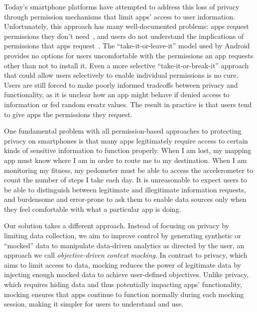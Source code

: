 Today's smartphone platforms have attempted to address this loss of privacy
through permission mechanisms that limit apps' access to user information.
Unfortunately, this approach has many well-documented problems: apps request
permissions they don't need~\cite{taintdroid-osdi,demystified-ccs11}, and users
do not understand the implications of permissions that apps
request~\cite{androidperms-soups12}. The ``take-it-or-leave-it'' model used by
Android provides no options for users uncomfortable with the permissions an app
requests other than not to install it. Even a more selective
``take-it-or-break-it'' approach~\cite{apex-asiaccs10} that could allow users
selectively to enable individual permissions is no cure.  Users are still
forced to make poorly informed tradeoffs between privacy and functionality, as
it is unclear how an app might behave if denied access to information or fed
random ersatz values. The result in practice is that users tend to give apps
the permissions they request.


One fundamental problem with all permission-based approaches to protecting
privacy on smartphones is that many apps legitimately require access to certain
kinds of sensitive information to function properly. When I am lost, my mapping
app must know where I am in order to route me to my destination. When I am
monitoring my fitness, my pedometer must be able to access the accelerometer to
count the number of steps I take each day. It is unreasonable to expect users
to be able to distinguish between legitimate and illegitimate information
requests, and burdensome and error-prone to ask them to enable data sources
only when they feel comfortable with what a particular app is doing.

Our solution takes a different approach. Instead of focusing on privacy by
limiting data collection, we aim to improve control by generating synthetic or
``mocked'' data to manipulate data-driven analytics as directed by the user, an
approach we call \textit{objective-driven context mocking}. In contrast to
privacy, which aims to limit access to data, mocking reduces the power of
legitimate data by injecting enough mocked data to achieve user-defined
objectives.  Unlike privacy, which requires hiding data and thus potentially
impacting apps' functionality, mocking ensures that apps continue to function
normally during each mocking session, making it simpler for users to understand
and use.

